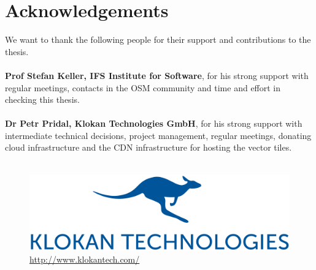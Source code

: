 

\bigskip


\begingroup

\let\clearpage\relax
\let\cleardoublepage\relax
\let\cleardoublepage\relax

\chapter*{Acknowledgements} %

We want to thank the following people for their support and contributions to the thesis.\\\\

\textbf{Prof Stefan Keller, IFS Institute for Software}, for his strong support with regular meetings, contacts in the OSM community and time and effort in checking this thesis.\\\\

\textbf{Dr Petr Pridal, Klokan Technologies GmbH}, for his strong support with intermediate technical decisions, project management, regular meetings, donating cloud infrastructure and the CDN infrastructure for hosting the vector tiles.\\\\

\begin{figure}[H]
  \centering
  \includegraphics[scale=0.3]{images/klokantech_logo.png}
  \caption*{\url{http://www.klokantech.com/}}
\end{figure}
\endgroup

